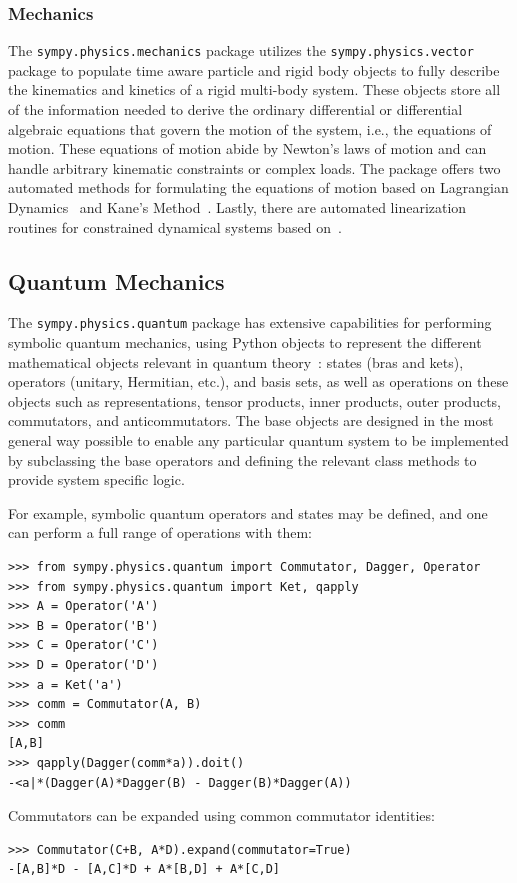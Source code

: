 \subsubsection{Mechanics}

The \verb|sympy.physics.mechanics| package utilizes the \texttt{sympy.\allowbreak{}physics.\allowbreak{}vector} package
to populate time aware particle and rigid body objects to fully describe the
kinematics and kinetics of a rigid multi-body system. These objects store all
of the information needed to derive the ordinary differential or differential
algebraic equations that govern the motion of the system, i.e., the equations
of motion. These equations of motion abide by Newton's laws of motion and can
handle arbitrary kinematic constraints or complex loads. The package
offers two automated methods for formulating the equations of motion based on
Lagrangian Dynamics~\cite{Lagrange1811} and Kane's Method~\cite{Kane1985}. Lastly, there
are automated linearization routines for constrained dynamical
systems based on~\cite{Peterson2014}.

\subsection{Quantum Mechanics}

The \verb|sympy.physics.quantum| package has extensive capabilities for
performing symbolic quantum mechanics, using Python objects to represent the
different mathematical objects relevant in quantum theory~\cite{Sakurai2010}:
states (bras and kets), operators (unitary, Hermitian, etc.), and basis sets, as
well as operations on these objects such as representations, tensor products,
inner products, outer products, commutators, and anticommutators. The base
objects are designed in the most general way possible to enable any particular
quantum system to be implemented by subclassing the base operators and defining
the relevant class methods to provide system specific logic.

For example, symbolic quantum operators and states may be defined, and one can perform
a full range of operations with them:
\begin{verbatim}
>>> from sympy.physics.quantum import Commutator, Dagger, Operator
>>> from sympy.physics.quantum import Ket, qapply
>>> A = Operator('A')
>>> B = Operator('B')
>>> C = Operator('C')
>>> D = Operator('D')
>>> a = Ket('a')
>>> comm = Commutator(A, B)
>>> comm
[A,B]
>>> qapply(Dagger(comm*a)).doit()
-<a|*(Dagger(A)*Dagger(B) - Dagger(B)*Dagger(A))
\end{verbatim}
Commutators can be expanded using common commutator identities:
\begin{verbatim}
>>> Commutator(C+B, A*D).expand(commutator=True)
-[A,B]*D - [A,C]*D + A*[B,D] + A*[C,D]
\end{verbatim}


